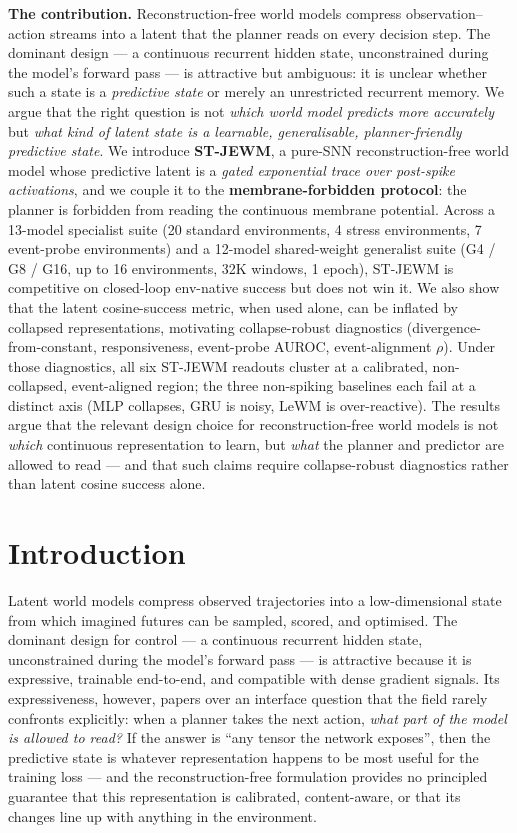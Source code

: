 \documentclass{article}
\begin{document}
\textbf{The contribution.} Reconstruction-free world models compress observation--action streams into a latent that the planner reads on every decision step. The dominant design --- a continuous recurrent hidden state, unconstrained during the model's forward pass --- is attractive but ambiguous: it is unclear whether such a state is a \emph{predictive state} or merely an unrestricted recurrent memory. We argue that the right question is not \emph{which world model predicts more accurately} but \emph{what kind of latent state is a learnable, generalisable, planner-friendly predictive state}. We introduce \textbf{ST-JEWM}, a pure-SNN reconstruction-free world model whose predictive latent is a \emph{gated exponential trace over post-spike activations}, and we couple it to the \textbf{membrane-forbidden protocol}: the planner is forbidden from reading the continuous membrane potential. Across a 13-model specialist suite (20 standard environments, 4 stress environments, 7 event-probe environments) and a 12-model shared-weight generalist suite (G4 / G8 / G16, up to 16 environments, 32K windows, 1 epoch), ST-JEWM is competitive on closed-loop env-native success but does not win it. We also show that the latent cosine-success metric, when used alone, can be inflated by collapsed representations, motivating collapse-robust diagnostics (divergence-from-constant, responsiveness, event-probe AUROC, event-alignment $\rho$). Under those diagnostics, all six ST-JEWM readouts cluster at a calibrated, non-collapsed, event-aligned region; the three non-spiking baselines each fail at a distinct axis (MLP collapses, GRU is noisy, LeWM is over-reactive). The results argue that the relevant design choice for reconstruction-free world models is not \emph{which} continuous representation to learn, but \emph{what} the planner and predictor are allowed to read --- and that such claims require collapse-robust diagnostics rather than latent cosine success alone.

\section{Introduction}

Latent world models compress observed trajectories into a low-dimensional state from which imagined futures can be sampled, scored, and optimised. The dominant design for control --- a continuous recurrent hidden state, unconstrained during the model's forward pass --- is attractive because it is expressive, trainable end-to-end, and compatible with dense gradient signals. Its expressiveness, however, papers over an interface question that the field rarely confronts explicitly: when a planner takes the next action, \emph{what part of the model is allowed to read?} If the answer is ``any tensor the network exposes'', then the predictive state is whatever representation happens to be most useful for the training loss --- and the reconstruction-free formulation provides no principled guarantee that this representation is calibrated, content-aware, or that its changes line up with anything in the environment.
\end{document}
